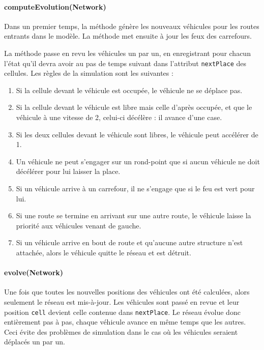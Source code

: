 \documentclass[a4paper,11pt, titlepage]{extarticle}
\begin{document}
\paragraph{computeEvolution(Network)}

Dans un premier temps, la méthode génère les nouveaux véhicules pour les routes entrants dans le modèle. La méthode met ensuite à jour les feux des carrefours.

La méthode passe en revu les véhicules un par un, en enregistrant pour chacun l'état qu'il devra avoir au pas de temps suivant dans l'attribut \texttt{nextPlace} des cellules. Les règles de la simulation sont les suivantes :

\begin{enumerate}
\item Si la cellule devant le véhicule est occupée, le véhicule ne se déplace pas.
\item Si la cellule devant le véhicule est libre mais celle d'après occupée, et que le véhicule à une vitesse de 2, celui-ci décélère : il avance d'une case.
\item Si les deux cellules devant le véhicule sont libres, le véhicule peut accélérer de 1.
\item Un véhicule ne peut s'engager sur un rond-point que si aucun véhicule ne doit décélérer pour lui laisser la place.
\item Si un véhicule arrive à un carrefour, il ne s'engage que si le feu est vert pour lui.
\item Si une route se termine en arrivant sur une autre route, le véhicule laisse la priorité aux véhicules venant de gauche.
\item Si un véhicule arrive en bout de route et qu'aucune autre structure n'est attachée, alors le véhicule quitte le réseau et est détruit.
\end{enumerate}

\paragraph{evolve(Network)}

Une fois que toutes les nouvelles positions des véhicules ont été calculées, alors seulement le réseau est mis-à-jour. Les véhicules sont passé en revue et leur position \texttt{cell} devient celle contenue dans \texttt{nextPlace}. Le réseau évolue donc entièrement pas à pas, chaque véhicule avance en même temps que les autres. Ceci évite des problèmes de simulation dans le cas où les véhicules seraient déplacés un par un.
\end{document}
